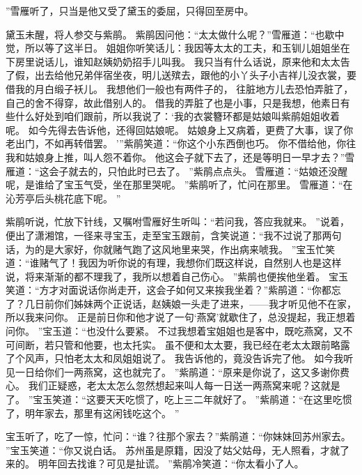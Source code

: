 ”雪雁听了，只当是他又受了黛玉的委屈，只得回至房中。
\par
黛玉未醒，将人参交与紫鹃。
紫鹃因问他：“太太做什么呢？”雪雁道：“也歇中觉，所以等了这半日。
姐姐你听笑话儿：我因等太太的工夫，和玉钏儿姐姐坐在下房里说话儿，谁知赵姨奶奶招手儿叫我。
我只当有什么话说，原来他和太太告了假，出去给他兄弟伴宿坐夜，明儿送殡去，跟他的小丫头子小吉祥儿没衣裳，要借我的月白缎子袄儿。
我想他们一般也有两件子的，
往脏地方儿去恐怕弄脏了，自己的舍不得穿，故此借别人的。
借我的弄脏了也是小事，只是我想，他素日有些什么好处到咱们跟前，所以我说了：‘我的衣裳簪环都是姑娘叫紫鹃姐姐收着呢。
如今先得去告诉他，还得回姑娘呢。
姑娘身上又病着，更费了大事，误了你老出门，不如再转借罢。
’”紫鹃笑道：“你这个小东西倒也巧。
你不借给他，你往我和姑娘身上推，叫人怨不着你。
他这会子就下去了，还是等明日一早才去？”雪雁道：“这会子就去的，只怕此时已去了。
”紫鹃点点头。
雪雁道：“姑娘还没醒呢，是谁给了宝玉气受，坐在那里哭呢。
”紫鹃听了，忙问在那里。
雪雁道：“在沁芳亭后头桃花底下呢。
”\par
紫鹃听说，忙放下针线，又嘱咐雪雁好生听叫：“若问我，答应我就来。
”说着，便出了潇湘馆，一径来寻宝玉，走至宝玉跟前，含笑说道：“我不过说了那两句话，为的是大家好，你就赌气跑了这风地里来哭，作出病来唬我。
”宝玉忙笑道：“谁赌气了！我因为听你说的有理，我想你们既这样说，自然别人也是这样说，将来渐渐的都不理我了，我所以想着自己伤心。
”紫鹃也便挨他坐着。
宝玉笑道：“方才对面说话你尚走开，这会子如何又来挨我坐着？”紫鹃道：“你都忘了？几日前你们姊妹两个正说话，赵姨娘一头走了进来，——我才听见他不在家，所以我来问你。
正是前日你和他才说了一句‘燕窝’就歇住了，总没提起，我正想着问你。
”宝玉道：“也没什么要紧。
不过我想着宝姐姐也是客中，既吃燕窝，又不可间断，若只管和他要，也太托实。
虽不便和太太要，我已经在老太太跟前略露了个风声，只怕老太太和凤姐姐说了。
我告诉他的，竟没告诉完了他。
如今我听见一日给你们一两燕窝，这也就完了。
”紫鹃道：“原来是你说了，这又多谢你费心。
我们正疑惑，老太太怎么忽然想起来叫人每一日送一两燕窝来呢？这就是了。
”宝玉笑道：“这要天天吃惯了，吃上三二年就好了。
”紫鹃道：“在这里吃惯了，明年家去，那里有这闲钱吃这个。
”\par
宝玉听了，吃了一惊，忙问：“谁？往那个家去？”紫鹃道：“你妹妹回苏州家去。
”宝玉笑道：“你又说白话。
苏州虽是原籍，因没了姑父姑母，无人照看，才就了来的。
明年回去找谁？可见是扯谎。
”紫鹃冷笑道：“你太看小了人。
